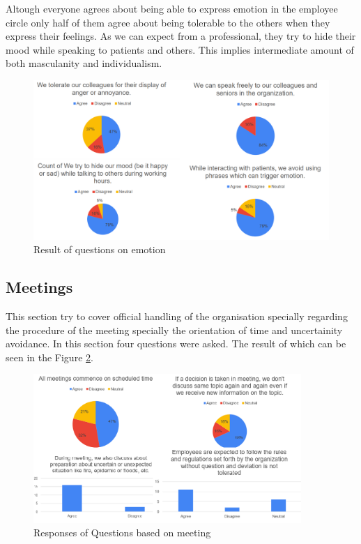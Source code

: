 \documentclass{article}
\begin{document}
Altough everyone agrees about being able to express emotion in the employee circle only half of them agree about being tolerable to the others when they express their feelings. As we can expect from a professional, they try to hide their mood while speaking to patients and others. This implies intermediate amount of both masculanity and individualism.

\begin{figure}
    \centering
    \includegraphics[width = 4.5 in]{Emotion.png}
    \caption{Result of questions on emotion}
    \label{Emotion}
\end{figure}

\subsection{Meetings}

This section try to cover official handling of the organisation specially regarding the procedure of the meeting specially the orientation of time and uncertainity avoidance. In this section four questions were asked. The result of which can be seen in the Figure \ref{meeting}.

\begin{figure}
    \begin{center}
        \includegraphics[width = 4in]{Meeting.png}
    \end{center}
    \caption{Responses of Questions based on meeting}
    \label{meeting}
\end{figure}
\end{document}
